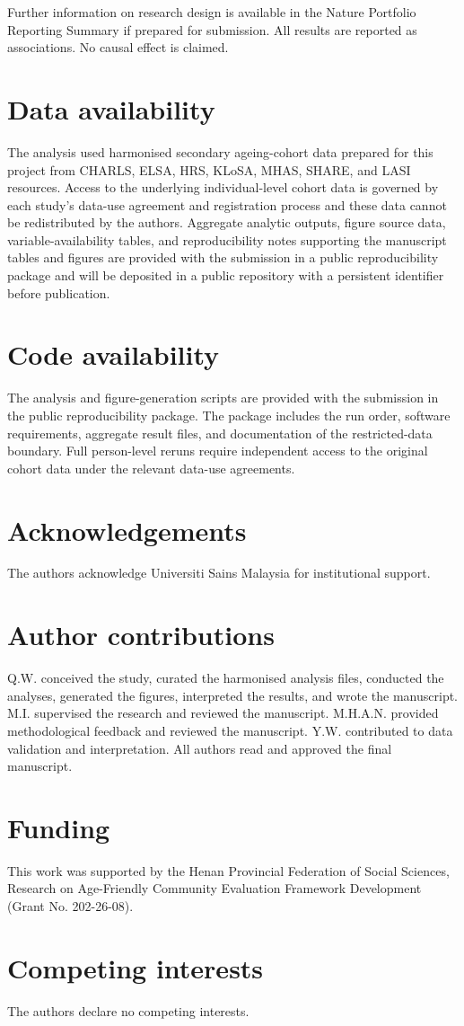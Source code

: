 \documentclass[pdflatex,sn-nature]{sn-jnl}
\begin{document}
Further information on research design is available in the Nature Portfolio Reporting Summary if prepared for submission. All results are reported as associations. No causal effect is claimed.

\section{Data availability}

The analysis used harmonised secondary ageing-cohort data prepared for this project from CHARLS, ELSA, HRS, KLoSA, MHAS, SHARE, and LASI resources. Access to the underlying individual-level cohort data is governed by each study's data-use agreement and registration process and these data cannot be redistributed by the authors. Aggregate analytic outputs, figure source data, variable-availability tables, and reproducibility notes supporting the manuscript tables and figures are provided with the submission in a public reproducibility package and will be deposited in a public repository with a persistent identifier before publication.

\section{Code availability}

The analysis and figure-generation scripts are provided with the submission in the public reproducibility package. The package includes the run order, software requirements, aggregate result files, and documentation of the restricted-data boundary. Full person-level reruns require independent access to the original cohort data under the relevant data-use agreements.

\section{Acknowledgements}

The authors acknowledge Universiti Sains Malaysia for institutional support.

\section{Author contributions}

Q.W. conceived the study, curated the harmonised analysis files, conducted the analyses, generated the figures, interpreted the results, and wrote the manuscript. M.I. supervised the research and reviewed the manuscript. M.H.A.N. provided methodological feedback and reviewed the manuscript. Y.W. contributed to data validation and interpretation. All authors read and approved the final manuscript.

\section{Funding}

This work was supported by the Henan Provincial Federation of Social Sciences, Research on Age-Friendly Community Evaluation Framework Development (Grant No. 202-26-08).

\section{Competing interests}

The authors declare no competing interests.


\end{document}
